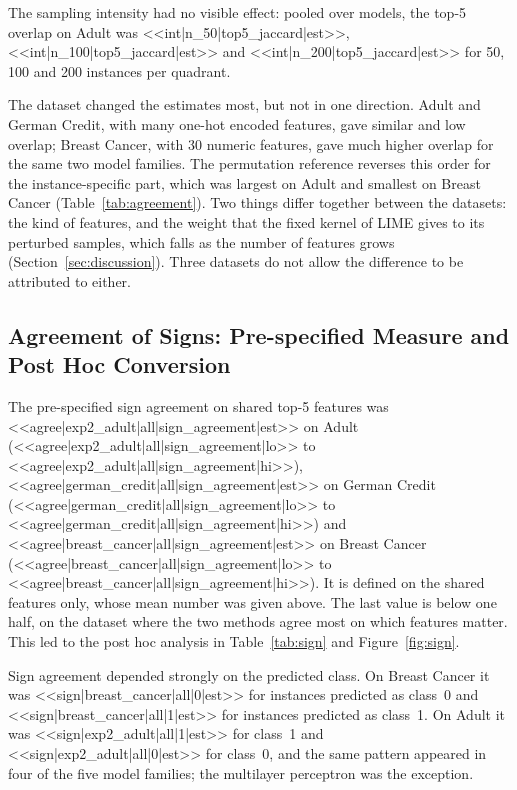 The sampling intensity had no visible effect: pooled over models, the top-5 overlap on
Adult was <<int|n_50|top5_jaccard|est>>, <<int|n_100|top5_jaccard|est>> and
<<int|n_200|top5_jaccard|est>> for 50, 100 and 200 instances per quadrant. 

The dataset changed the estimates most, but not in one direction. Adult and German
Credit, with many one-hot encoded features, gave similar and low overlap; Breast Cancer,
with 30 numeric features, gave much higher overlap for the same two model families. The
permutation reference reverses this order for the instance-specific part, which was
largest on Adult and smallest on Breast Cancer (Table~\ref{tab:agreement}). Two things
differ together between the datasets: the kind of features, and the weight that the fixed
kernel of LIME gives to its perturbed samples, which falls as the number of features grows
(Section~\ref{sec:discussion}). Three datasets do not allow the difference to be
attributed to either.

\subsection{Agreement of Signs: Pre-specified Measure and Post Hoc Conversion}
\label{sec:results:sign}

The pre-specified sign agreement on shared top-5 features was
<<agree|exp2_adult|all|sign_agreement|est>> on Adult
(<<agree|exp2_adult|all|sign_agreement|lo>> to <<agree|exp2_adult|all|sign_agreement|hi>>),
<<agree|german_credit|all|sign_agreement|est>> on German Credit
(<<agree|german_credit|all|sign_agreement|lo>> to
<<agree|german_credit|all|sign_agreement|hi>>) and
<<agree|breast_cancer|all|sign_agreement|est>> on Breast Cancer
(<<agree|breast_cancer|all|sign_agreement|lo>> to
<<agree|breast_cancer|all|sign_agreement|hi>>). It is defined on the shared features
only, whose mean number was given above. The last value is below
one half, on the dataset where the two methods agree most on which features matter. This
led to the post hoc analysis in Table~\ref{tab:sign} and Figure~\ref{fig:sign}.

Sign agreement depended strongly on the predicted class. On Breast Cancer it was
<<sign|breast_cancer|all|0|est>> for instances predicted as class~0 and
<<sign|breast_cancer|all|1|est>> for instances predicted as class~1. On Adult it was
<<sign|exp2_adult|all|1|est>> for class~1 and <<sign|exp2_adult|all|0|est>> for
class~0, and the same pattern appeared in four of the five model families; the
multilayer perceptron was the exception.

